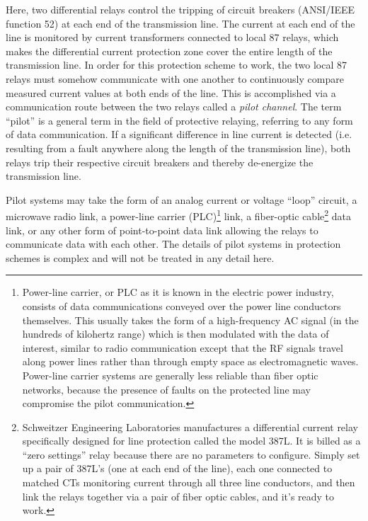Here, two differential relays control the tripping of circuit breakers (ANSI/IEEE function 52) at each end of the transmission line.  The current at each end of the line is monitored by current transformers connected to local 87 relays, which makes the differential current protection zone cover the entire length of the transmission line.  In order for this protection scheme to work, the two local 87 relays must somehow communicate with one another to continuously compare measured current values at both ends of the line.  This is accomplished via a communication route between the two relays called a \textit{pilot channel}.  The term ``pilot'' is a general term in the field of protective relaying, referring to any form of data communication.  If a significant difference in line current is detected (i.e. resulting from a fault anywhere along the length of the transmission line), both relays trip their respective circuit breakers and thereby de-energize the transmission line.  

Pilot systems may take the form of an analog current or voltage ``loop'' circuit, a microwave radio link, a power-line carrier (PLC)\footnote{Power-line carrier, or PLC as it is known in the electric power industry, consists of data communications conveyed over the power line conductors themselves.  This usually takes the form of a high-frequency AC signal (in the hundreds of kilohertz range) which is then modulated with the data of interest, similar to radio communication except that the RF signals travel along power lines rather than through empty space as electromagnetic waves.  Power-line carrier systems are generally less reliable than fiber optic networks, because the presence of faults on the protected line may compromise the pilot communication.} link, a fiber-optic cable\footnote{Schweitzer Engineering Laboratories manufactures a differential current relay specifically designed for line protection called the model 387L.  It is billed as a ``zero settings'' relay because there are no parameters to configure.  Simply set up a pair of 387L's (one at each end of the line), each one connected to matched CTs monitoring current through all three line conductors, and then link the relays together via a pair of fiber optic cables, and it's ready to work.} data link, or any other form of point-to-point data link allowing the relays to communicate data with each other.  The details of pilot systems in protection schemes is complex and will not be treated in any detail here.  

